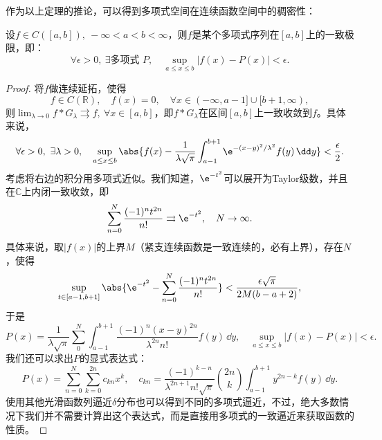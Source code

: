 作为以上定理的推论，可以得到多项式空间在连续函数空间中的稠密性：
\begin{theorem}[*Weierstrass第一逼近定理]\label{thm:weierstrass_1}
    设$f\in C([a,b]),\ -\infty<a<b<\infty$，则$f$是某个多项式序列在$[a,b]$上的一致极限，即：
    \begin{equation}
        \forall \epsilon>0,\ \exists \text{多项式 } P,\quad \sup_{a\leq x\leq b}|f(x)-P(x)|<\epsilon.
    \end{equation}
\end{theorem}
\begin{proof}
    将$f$做连续延拓，使得
    \begin{equation}
        f\in C(\mathbb{R}),\quad f(x)=0,\quad\forall x\in (-\infty,a-1]\cup[b+1,\infty),
    \end{equation}
    则$\lim_{\lambda\to 0}f*G_\lambda \rightrightarrows f,\ \forall x\in[a,b]$，即$f*G_\lambda$在区间$[a,b]$上一致收敛到$f$。具体来说，
    \begin{equation}
        \forall \epsilon>0,\ \exists \lambda>0,\quad \sup_{a\leq x\leq b}\abs{f(x)-\frac{1}{\lambda\sqrt{\pi}}\int_{a-1}^{b+1}\e^{-(x-y)^2/\lambda^2}f(y)\,\dd y}<\frac{\epsilon}{2}.
    \end{equation}
    考虑将右边的积分用多项式近似。我们知道，$\e^{-t^2}$可以展开为Taylor级数，并且在$\mathbb{C}$上内闭一致收敛，即
    \begin{equation}
        \sum_{n=0}^{N}\frac{(-1)^n t^{2n}}{n!}\rightrightarrows \e^{-t^2},\quad N\to\infty.
    \end{equation}
    具体来说，取$|f(x)|$的上界$M$（紧支连续函数是一致连续的，必有上界），存在$N$，使得
    \begin{equation}
        \sup_{t\in[a-1,b+1]}\abs{\e^{-t^2}-\sum_{n=0}^{N}\frac{(-1)^n t^{2n}}{n!}}<\frac{\epsilon\sqrt{\pi}}{2M(b-a+2)},
    \end{equation}
    于是
    \begin{equation}
        P(x)=\frac{1}{\lambda\sqrt{\pi}}\sum_{0}^{N}\int_{a-1}^{b+1}\frac{(-1)^n (x-y)^{2n}}{\lambda^{2n}n!}f(y)\,\dd y,\quad \sup_{a\leq x\leq b}|f(x)-P(x)|<\epsilon.
    \end{equation}
    我们还可以求出$P$的显式表达式：
    \begin{equation}
        P(x)=\sum_{n=0}^{N}\sum_{k=0}^{2n}c_{kn}x^k,\quad c_{kn}=\frac{(-1)^{k-n}}{\lambda^{2n+1}n!\sqrt{\pi}}\binom{2n}{k}\int_{a-1}^{b+1}y^{2n-k}f(y)\,\dd y.
    \end{equation}
    使用其他光滑函数列逼近$\delta$分布也可以得到不同的多项式逼近，不过，绝大多数情况下我们并不需要计算出这个表达式，而是直接用多项式的一致逼近来获取函数的性质。
\end{proof}

